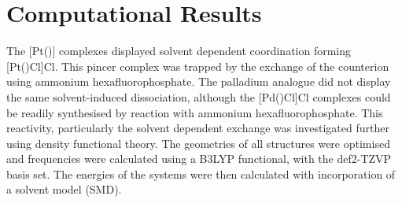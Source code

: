 

\section{Computational Results}

The [Pt(\tBuxantphos)] complexes displayed solvent dependent coordination forming [Pt(\tBuxantphosk)Cl]Cl.  This pincer complex was trapped by the exchange of the counterion using ammonium hexafluorophosphate.  The palladium analogue did not display the same solvent-induced dissociation, although the [Pd(\tBuxantphosk)Cl]Cl complexes could be readily synthesised by reaction with ammonium hexafluorophosphate.  This reactivity, particularly the solvent dependent exchange was investigated further using density functional theory.  The geometries of all structures were optimised and frequencies were calculated using a B3LYP functional\cite{Becke1993, Lee1988, Vosko1980, Stephens1994}, with the def2-TZVP basis set\cite{Andrae1990, Weigend2005}.  The energies of the systems were then calculated with incorporation of a solvent model (SMD).

